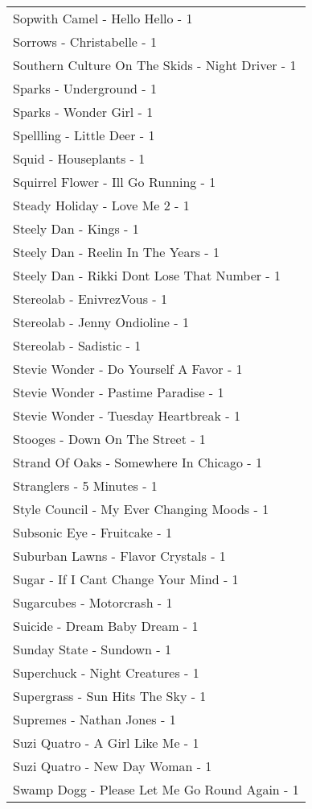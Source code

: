 \documentclass[
]{article}
\begin{document}
\begin{longtable}{l}
Sopwith Camel - Hello Hello - 1 \\ 
Sorrows - Christabelle - 1 \\ 
Southern Culture On The Skids - Night Driver - 1 \\ 
Sparks - Underground - 1 \\ 
Sparks - Wonder Girl - 1 \\ 
Spellling - Little Deer - 1 \\ 
Squid - Houseplants - 1 \\ 
Squirrel Flower - Ill Go Running - 1 \\ 
Steady Holiday - Love Me 2 - 1 \\ 
Steely Dan - Kings - 1 \\ 
Steely Dan - Reelin In The Years - 1 \\ 
Steely Dan - Rikki Dont Lose That Number - 1 \\ 
Stereolab - EnivrezVous - 1 \\ 
Stereolab - Jenny Ondioline - 1 \\ 
Stereolab - Sadistic - 1 \\ 
Stevie Wonder - Do Yourself A Favor - 1 \\ 
Stevie Wonder - Pastime Paradise - 1 \\ 
Stevie Wonder - Tuesday Heartbreak - 1 \\ 
Stooges - Down On The Street - 1 \\ 
Strand Of Oaks - Somewhere In Chicago - 1 \\ 
Stranglers - 5 Minutes - 1 \\ 
Style Council - My Ever Changing Moods - 1 \\ 
Subsonic Eye - Fruitcake - 1 \\ 
Suburban Lawns - Flavor Crystals - 1 \\ 
Sugar - If I Cant Change Your Mind - 1 \\ 
Sugarcubes - Motorcrash - 1 \\ 
Suicide - Dream Baby Dream - 1 \\ 
Sunday State - Sundown - 1 \\ 
Superchuck - Night Creatures - 1 \\ 
Supergrass - Sun Hits The Sky - 1 \\ 
Supremes - Nathan Jones - 1 \\ 
Suzi Quatro - A Girl Like Me - 1 \\ 
Suzi Quatro - New Day Woman - 1 \\ 
Swamp Dogg - Please Let Me Go Round Again - 1 \\ 

\end{longtable}
\end{document}
